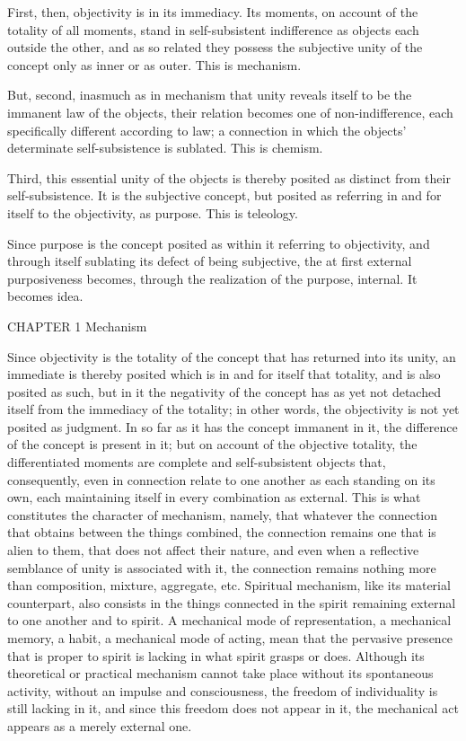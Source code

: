 First, then, objectivity is in its immediacy.
Its moments, on account of the totality of all moments,
stand in self-subsistent indifference
as objects each outside the other,
and as so related they possess
the subjective unity of the concept
only as inner or as outer.
This is mechanism.

But, second, inasmuch as in mechanism that unity
reveals itself to be the immanent law of the objects,
their relation becomes one of non-indifference,
each specifically different according to law;
a connection in which the objects'
determinate self-subsistence is sublated.
This is chemism.

Third, this essential unity of the objects is
thereby posited as distinct from their self-subsistence.
It is the subjective concept,
but posited as referring in and for itself
to the objectivity, as purpose.
This is teleology.

Since purpose is the concept posited
as within it referring to objectivity,
and through itself sublating its defect
of being subjective,
the at first external purposiveness becomes,
through the realization of the purpose, internal.
It becomes idea.

CHAPTER 1 Mechanism

Since objectivity is the totality of the concept
that has returned into its unity,
an immediate is thereby posited which is in and for itself
that totality, and is also posited as such,
but in it the negativity of the concept has as yet
not detached itself from the immediacy of the totality;
in other words, the objectivity is not yet posited as judgment.
In so far as it has the concept immanent in it,
the difference of the concept is present in it;
but on account of the objective totality,
the differentiated moments are
complete and self-subsistent objects
that, consequently, even in connection
relate to one another as each standing on its own,
each maintaining itself in every combination as external.
This is what constitutes the character of mechanism,
namely,  that whatever the connection that
obtains between the things combined,
the connection remains one that is alien to them,
that does not affect their nature,
and even when a reflective semblance
of unity is associated with it,
the connection remains nothing more than
composition, mixture, aggregate, etc.
Spiritual mechanism, like its material counterpart,
also consists in the things connected in the spirit
remaining external to one another and to spirit.
A mechanical mode of representation,
a mechanical memory, a habit, a mechanical mode of acting,
mean that the pervasive presence that is proper to spirit
is lacking in what spirit grasps or does.
Although its theoretical or practical mechanism
cannot take place without its spontaneous activity,
without an impulse and consciousness,
the freedom of individuality is still lacking in it,
and since this freedom does not appear in it,
the mechanical act appears as a merely external one.

